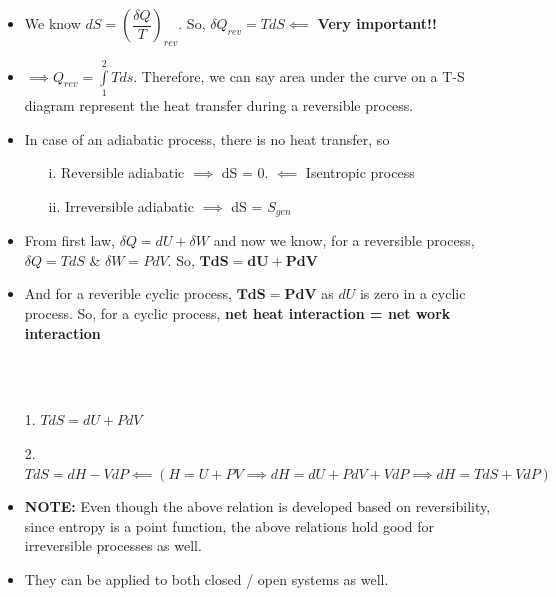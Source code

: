 \documentclass[8pt]{article}
\begin{document}
	\begin{itemize}
		\item We know $\boxed{dS=\left(\dfrac{\delta Q}{T}\right)_{rev}}$. So, $\boxed{\delta Q_{rev} = TdS} \impliedby$ \textbf{Very important!!}
		\item $\implies \boxed{Q_{rev} = \int\limits_1^2Tds}$. Therefore, we can say area under the curve on a T-S diagram represent the heat transfer during a reversible process. 
		\item 	In case of an adiabatic process, there is no heat transfer, so
			\begin{itemize}
				\item[i.]Reversible adiabatic $\implies$ dS = 0. $\impliedby$ Isentropic process
				\item[ii.]Irreversible adiabatic $\implies$ dS = $S_{gen}$
			\end{itemize}
		\item From first law, $\delta Q = dU + \delta W$ and now we know, for a reversible process, $\delta Q = TdS$ \& $\delta W = PdV$. So, $\bm{TdS = dU + PdV}$
		\item And for a reverible cyclic process, $\bm{TdS = PdV}$ as $dU$ is zero in a cyclic process. So, for a cyclic process, \textbf{net heat interaction = net work interaction}
	\end{itemize}\hrulefill\\
\\
	\begin{itemize}
		\item[1.] $\boxed{TdS = dU + PdV}$
		\item[2.] $\boxed{TdS = dH - VdP} \impliedby \left(H = U + PV \implies dH = dU + PdV + VdP \implies dH = TdS + VdP\right)$
		\item \textbf{NOTE:} Even though the above relation is developed based on reversibility, since entropy is a point function, the above relations hold good for irreversible processes as well. 
		\item They can be applied to both closed / open systems as well. 
	\end{itemize}\hrulefill\\
\\
\end{document}
